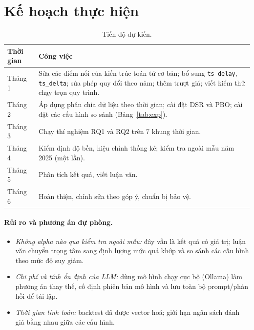 \documentclass[12pt,a4paper]{article}
\newcommand{\code}[1]{\texttt{#1}}
\begin{document}
\section{Kế hoạch thực hiện}

\begin{table}[H]
\centering
\caption{Tiến độ dự kiến.}
\label{tab:plan}
\begin{tabularx}{\textwidth}{lL}
\toprule
Thời gian & Công việc \\
\midrule
Tháng 1 & Sửa các điểm nối của kiến trúc toán tử cơ bản; bổ sung \code{ts\_delay}, \code{ts\_delta}; sửa phép quy đổi theo năm; thêm trượt giá; viết kiểm thử chạy trọn quy trình. \\
Tháng 2 & Áp dụng phân chia dữ liệu theo thời gian; cài đặt DSR và PBO; cài đặt các cấu hình so sánh (Bảng~\ref{tab:exp}). \\
Tháng 3 & Chạy thí nghiệm RQ1 và RQ2 trên 7 khung thời gian. \\
Tháng 4 & Kiểm định độ bền, hiệu chỉnh thống kê; kiểm tra ngoài mẫu năm 2025 (một lần). \\
Tháng 5 & Phân tích kết quả, viết luận văn. \\
Tháng 6 & Hoàn thiện, chỉnh sửa theo góp ý, chuẩn bị bảo vệ. \\
\bottomrule
\end{tabularx}
\end{table}

\paragraph{Rủi ro và phương án dự phòng.}
\begin{itemize}
  \item \emph{Không alpha nào qua kiểm tra ngoài mẫu:} đây vẫn là kết quả có giá trị; luận văn chuyển trọng tâm sang định lượng mức quá khớp và so sánh các cấu hình theo mức độ suy giảm.
  \item \emph{Chi phí và tính ổn định của LLM:} dùng mô hình chạy cục bộ (Ollama) làm phương án thay thế, cố định phiên bản mô hình và lưu toàn bộ prompt/phản hồi để tái lập.
  \item \emph{Thời gian tính toán:} backtest đã được vector hoá; giới hạn ngân sách đánh giá bằng nhau giữa các cấu hình.
\end{itemize}



\end{document}
